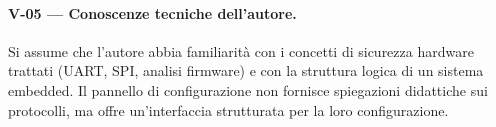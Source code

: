 \paragraph{V-05 --- Conoscenze tecniche dell'autore.} Si assume che l'autore abbia familiarità con i concetti di sicurezza hardware trattati (UART, SPI, analisi firmware) e con la struttura logica di un sistema embedded. Il pannello di configurazione non fornisce spiegazioni didattiche sui protocolli, ma offre un'interfaccia strutturata per la loro configurazione.
